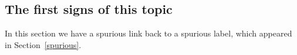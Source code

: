 \subsection{The first signs of this topic}

In this section we have a spurious link back to a spurious label, which appeared in Section~\ref{spurious}.






